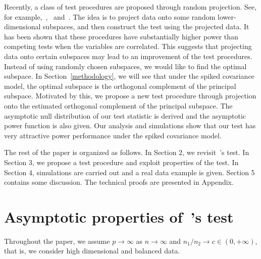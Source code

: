 \documentclass[3p]{elsarticle}
\theoremstyle{plain}
\theoremstyle{definition}
\theoremstyle{remark}
\begin{document}
Recently, a class of test procedures are proposed through random projection.
See, for example,~\cite{Lopes2015A},~\cite{Thulin2014A} and~\cite{Srivastava2014RAPTT}.
The idea is to project data onto some random lower-dimensional subspaces, and then construct the test using the projected data.
It has been shown that these procedures have substantially higher power than competing tests when the variables are correlated. 
This suggests that projecting data onto certain subspaces may lead to an improvement of the test procedures.
Instead of using randomly chosen subspaces, we would like to find the optimal subspace.
In Section~\ref{methodology}, we will see that under the spiked covariance model, the optimal subspace is the orthogonal complement of the principal subspace.
Motivated by this, we propose a new test procedure through projection onto the estimated orthogonal complement of the principal subspace.  
The asymptotic null distribution of our test statistic is derived and the asymptotic power function is also given.
Our analysis and simulations show that our test has very attractive power performance under the spiked covariance model.




The rest of the paper is organized as follows. In Section 2,  we revisit~\cite{Chen2010A}'s test.  In Section 3, we propose a test procedure and exploit properties of the test.  In Section 4, simulations are carried out and  a real data example is given. Section 5 contains some discussion. The technical proofs are presented in Appendix.

\section{Asymptotic properties of~\cite{Chen2010A}'s test}\label{sec:chen}
    Throughout the paper, we  assume $p\to \infty$ as $n\to \infty$ and ${n_1}/{n_2}\to c \in (0,+\infty)$, that is, we consider high dimensional and balanced data.
\end{document}
